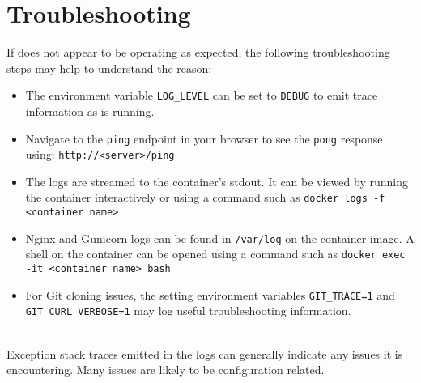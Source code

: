 \chapter{Troubleshooting}

If \cxoneflow does not appear to be operating as expected, the following
troubleshooting steps may help to understand the reason:

\begin{itemize}
    \item The environment variable \texttt{LOG\_LEVEL} can be set to \texttt{DEBUG}
    to emit trace information as \cxoneflow is running.

    \item Navigate to the \texttt{ping} endpoint in your browser to see the 
    \texttt{pong} response using: \texttt{http://<server>/ping}
    
    \item The \cxoneflow logs are streamed to the container's stdout.  It can be
    viewed by running the container interactively or using a command such as
    \texttt{docker logs -f <container name>}

    \item Nginx and Gunicorn logs can be found in \texttt{/var/log} on the container
    image.  A shell on the container can be opened using a command such as
    \texttt{docker exec -it <container name> bash}

    \item For Git cloning issues, the setting environment variables \texttt{GIT\_TRACE=1} and
    \texttt{GIT\_CURL\_VERBOSE=1} may log useful troubleshooting information.

\end{itemize}

\noindent\\Exception stack traces emitted in the \cxoneflow logs can generally
indicate any issues it is encountering.  Many issues are likely to be configuration
related.